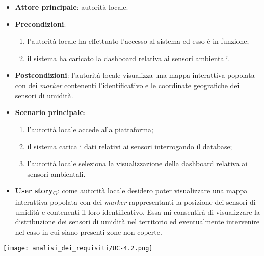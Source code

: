 \begin{itemize}
	\item \textbf{Attore principale}: autorità locale.
	\item \textbf{Precondizioni}:
	      \begin{enumerate}
		      \item l'autorità locale ha effettuato l'accesso al sistema ed esso è in funzione;
		      \item il sistema ha caricato la dashboard relativa ai sensori ambientali.
	      \end{enumerate}
	\item \textbf{Postcondizioni}: l'autorità locale visualizza una mappa interattiva popolata con dei \textit{marker} contenenti l'identificativo e le coordinate geografiche dei sensori di umidità.
	\item \textbf{Scenario principale}:
	      \begin{enumerate}
		      \item l'autorità locale accede alla piattaforma;
		      \item il sistema carica i dati relativi ai sensori interrogando il database;
		      \item l'autorità locale seleziona la visualizzazione della dashboard relativa ai sensori ambientali.
	      \end{enumerate}
	\item \href{https://7last.github.io/docs/rtb/documentazione-interna/glossario\#user-story}{\textbf{User story}\textsubscript{G}}:
	      come autorità locale desidero poter visualizzare una mappa interattiva popolata con dei \textit{marker} rappresentanti la posizione dei sensori di umidità
	      e contenenti il loro identificativo. Essa mi consentirà di visualizzare la distribuzione dei sensori di umidità nel territorio ed eventualmente intervenire nel caso in cui siano presenti zone non coperte.
\end{itemize}
\begin{center}
	\texttt{[image: analisi\_dei\_requisiti/UC-4.2.png]}
\end{center}


